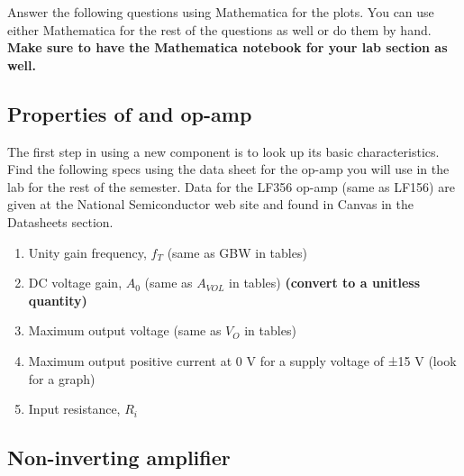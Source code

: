 \documentclass[10pt]{PhysLab1C} %
\begin{document}
Answer the following questions using Mathematica for the plots. You can
use either Mathematica for the rest of the questions as well or do them
by hand. \textbf{Make sure to have the Mathematica notebook for your lab
section as well.}

\subsection{Properties of and op-amp}

The first step in using a new component is to look up its basic
characteristics. Find the following specs using the data sheet for the
op-amp you will use in the lab for the rest of the semester. Data for
the LF356 op-amp (same as LF156) are given at the National Semiconductor
web site and found in Canvas in the Datasheets section.

\begin{enumerate}
\item
  Unity gain frequency, \(f_T\) (same as GBW in tables)
\item
  DC voltage gain, \(A_0\) (same as \(A_{VOL}\) in tables)
  \textbf{(convert to a unitless quantity)}
\item
  Maximum output voltage (same as \(V_O\) in tables)
\item
  Maximum output positive current at 0 V for a supply voltage of ±15 V
  (look for a graph)
\item
  Input resistance, \(R_i\)
\end{enumerate}

\subsection{Non-inverting amplifier}
\end{document}
